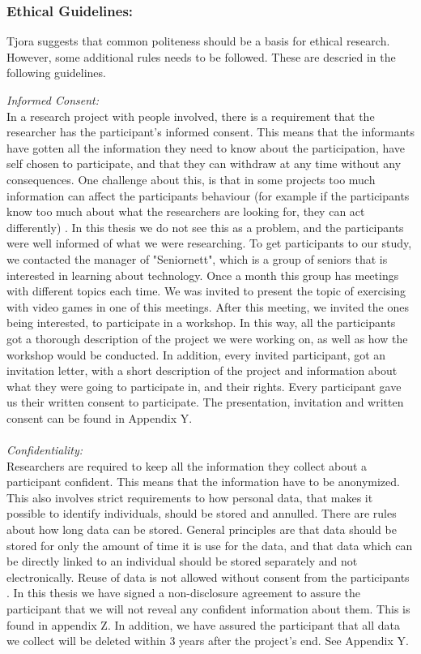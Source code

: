 \subsubsection{Ethical Guidelines:}
Tjora \cite{tjora} suggests that common politeness should be a basis for ethical research. However, some additional rules needs to be followed. These are descried in the following guidelines.

\emph{Informed Consent:} \\
In a research project with people involved, there is a requirement that the researcher has the participant's informed consent. This means that the informants have gotten all the information they need to know about the participation, have self chosen to participate, and that they can withdraw at any time without any consequences. One challenge about this, is that in some projects too much information can affect the participants behaviour (for example if the participants know too much about what the researchers are looking for, they can act differently) \cite{qualitative}. In this thesis we do not see this as a problem, and the participants were well informed of what we were researching. To get participants to our study, we contacted the manager of "Seniornett", which is a group of seniors that is interested in learning about technology. Once a month this group has meetings with different topics each time. We was invited to present the topic of exercising with video games in one of this meetings. After this meeting, we invited the ones being interested, to participate in a workshop. In this way, all the participants got a thorough description of the project we were working on, as well as how the workshop would be conducted. In addition, every invited participant, got an invitation letter, with a short description of the project and information about what they were going to participate in, and their rights. Every participant gave us their written consent to participate. The presentation, invitation and written consent can be found in Appendix Y.   \\ \\
\emph{Confidentiality:}\\
Researchers are required to keep all the information they collect about a participant confident. This means that the information have to be anonymized. This also involves strict requirements to how personal data, that makes it possible to identify individuals, should be stored and annulled. There are rules about how long data can be stored. General principles are that data should be stored for only the amount of time it is use for the data, and that data which can be directly linked to an individual should be stored separately and not electronically.  Reuse of data is not allowed without consent from the participants \cite{qualitative}. In this thesis we have signed a non-disclosure agreement to assure the participant that we will not reveal any confident information about them. This is found in appendix Z. In addition, we have assured the participant that all data we collect will be deleted within 3 years after the project's end. See Appendix Y. \\ \\
